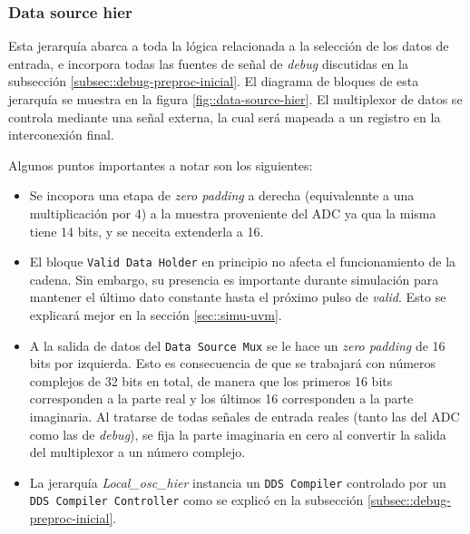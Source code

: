 \documentclass[../../main.tex]{subfiles}
\begin{document}

\subsubsection{Data source hier}
Esta jerarquía abarca a toda la lógica relacionada a la selección de los datos de entrada, e incorpora todas las fuentes de señal de \textit{debug} discutidas en la subsección \ref{subsec::debug-preproc-inicial}. El diagrama de bloques de esta jerarquía se muestra en la figura \ref{fig::data-source-hier}. El multiplexor de datos se controla mediante una señal externa, la cual será mapeada a un registro en la interconexión final.

Algunos puntos importantes a notar son los siguientes:
\begin{itemize}
    \item Se incopora una etapa de \textit{zero padding} a derecha (equivalennte a una multiplicación por 4) a la muestra proveniente del ADC ya qua la misma tiene 14 bits, y se neceita extenderla a 16.
    \item El bloque \texttt{Valid Data Holder} en principio no afecta el funcionamiento de la cadena. Sin embargo, su presencia es importante durante simulación para mantener el último dato constante hasta el próximo pulso de \textit{valid}. Esto se explicará mejor en la sección \ref{sec::simu-uvm}.
    \item A la salida de datos del \texttt{Data Source Mux} se le hace un \textit{zero padding} de 16 bits por izquierda. Esto es consecuencia de que se trabajará con números complejos de 32 bits en total, de manera que los primeros 16 bits corresponden a la parte real y los últimos 16 corresponden a la parte imaginaria. Al tratarse de todas señales de entrada reales (tanto las del ADC como las de \textit{debug}), se fija la parte imaginaria en cero al convertir la salida del multiplexor a un número complejo.
    \item La jerarquía \textit{Local\_osc\_hier} instancia un \texttt{DDS Compiler} controlado por un \texttt{DDS Compiler Controller} como se explicó en la subsección \ref{subsec::debug-preproc-inicial}.
\end{itemize}

\end{document}
